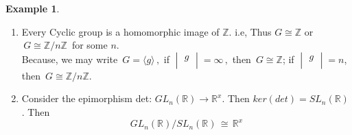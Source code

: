 \documentclass[11pt,a4paper]{article}
\theoremstyle{definition}
\newtheorem{exa}[thm]{Example}
\begin{document}
\begin{exa}
\begin{enumerate}
\item Every Cyclic group is a homomorphic image of $\mathbb{Z}$. i.e, Thus $G\cong \mathbb{Z}$ or $\, G\cong \mathbb{Z}\big/n\mathbb{Z}\,$ for some $n$.\\
Because, we may write $\, G = \langle g\rangle\,,$ if $\begin{vmatrix}
g\\
\end{vmatrix} = \infty\,, $ then $\, G\cong \mathbb{Z}$; if $\begin{vmatrix}
g\\
\end{vmatrix} = n$, then $\, G\cong \mathbb{Z}\big/n\mathbb{Z}$.

\item Consider the epimorphism  det$:\, G L_n(\mathbb{R})\longrightarrow \mathbb{R}^x$. Then $ker(det) = SL_n(\mathbb{R})$. Then $$GL_n(\mathbb{R})\big/SL_n(\mathbb{R}) \, \cong\, \mathbb{R}^x$$



\end{enumerate}
\end{exa}
\end{document}
